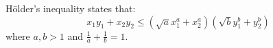 H\"older's inequality states that:
\[ 
x_1 y_1 + x_2 y_2
\leq
\left ( \sqrt{a} {x_1 ^{a} + x_2 ^{a}} \right )
\left ( \sqrt{b} {y_1 ^{b} + y_2 ^{b}} \right ) 
\]
where $ a ,b > 1 $ and $ \frac{1}{a} + \frac{1}{b} = 1  . $